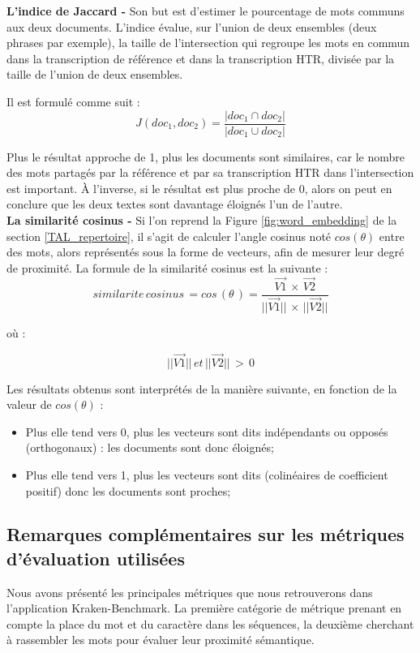 \textbf{L'indice de Jaccard -} Son but est d'estimer le pourcentage de mots communs aux deux documents. L'indice évalue, sur l'union de deux ensembles (deux phrases par exemple), la taille de l'intersection qui regroupe les mots en commun dans la transcription de référence et dans la transcription HTR, divisée par la taille de l'union de deux ensembles.

Il est formulé comme suit : $$ J(doc_1,doc_2) = \frac{|doc_1 \cap doc_2|}{|doc_1 \cup doc_2|} $$

Plus le résultat approche de 1, plus les documents sont similaires, car le nombre des mots partagés par la référence et par sa transcription HTR dans l'intersection est important. À l'inverse, si le résultat est plus proche de 0, alors on peut en conclure que les deux textes sont davantage éloignés l'un de l'autre.\\

\textbf{La similarité cosinus -} Si l'on reprend la Figure \ref{fig:word_embedding} de la section \ref{TAL_repertoire}, il s'agit de calculer l'angle cosinus noté $cos(\theta)$ entre des mots, alors représentés sous la forme de vecteurs, afin de mesurer leur degré de proximité. La formule de la similarité cosinus est la suivante : $$ similarite\, cosinus \, = cos\, (\theta\,) = \frac{\overrightarrow{V1}\, \times \,\overrightarrow{V2}}{||\overrightarrow{V1}||\, \times \,||\overrightarrow{V2}||} $$

où : 

$$ ||\overrightarrow{V1}||\, et\, ||\overrightarrow{V2}||\, >\, 0 $$

Les résultats obtenus sont interprétés de la manière suivante, en fonction de la valeur de $cos(\theta)$ :

\begin{itemize}
    \item Plus elle tend vers 0, plus les vecteurs sont dits indépendants ou opposés (orthogonaux) : les documents sont donc éloignés;
    \item Plus elle tend vers 1, plus les vecteurs sont dits (colinéaires de coefficient positif) donc les documents sont proches;
\end{itemize}

\subsection{Remarques complémentaires sur les métriques d'évaluation utilisées}

Nous avons présenté les principales métriques que nous retrouverons dans l'application Kraken-Benchmark. La première catégorie de métrique prenant en compte la place du mot et du caractère dans les séquences, la deuxième cherchant à rassembler les mots pour évaluer leur proximité sémantique.\\

